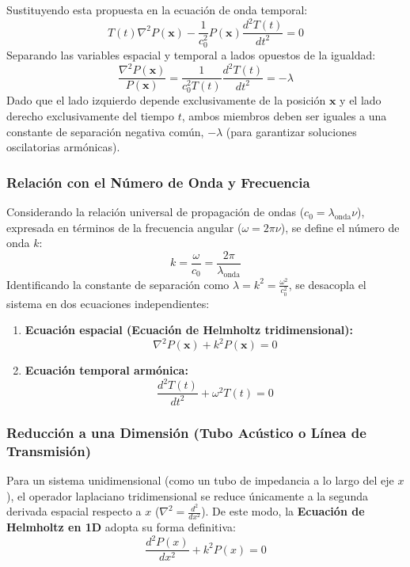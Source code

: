 \documentclass[11pt,letterpaper]{article}
\begin{document}
Sustituyendo esta propuesta en la ecuación de onda temporal:
\begin{equation}
    T(t) \nabla^2 P(\mathbf{x}) - \frac{1}{c_0^2} P(\mathbf{x}) \frac{d^2 T(t)}{dt^2} = 0
\end{equation}
Separando las variables espacial y temporal a lados opuestos de la igualdad:
\begin{equation}
    \frac{\nabla^2 P(\mathbf{x})}{P(\mathbf{x})} = \frac{1}{c_0^2 T(t)} \frac{d^2 T(t)}{dt^2} = -\lambda
\end{equation}
Dado que el lado izquierdo depende exclusivamente de la posición $\mathbf{x}$ y el lado derecho exclusivamente del tiempo $t$, ambos miembros deben ser iguales a una constante de separación negativa común, $-\lambda$ (para garantizar soluciones oscilatorias armónicas).

\subsubsection{Relación con el Número de Onda y Frecuencia}
Considerando la relación universal de propagación de ondas ($c_0 = \lambda_{\text{onda}} \nu$), expresada en términos de la frecuencia angular ($\omega = 2\pi \nu$), se define el número de onda $k$:
\begin{equation}
    k = \frac{\omega}{c_0} = \frac{2\pi}{\lambda_{\text{onda}}}
\end{equation}
Identificando la constante de separación como $\lambda = k^2 = \frac{\omega^2}{c_0^2}$, se desacopla el sistema en dos ecuaciones independientes:

\begin{enumerate}
    \item \textbf{Ecuación espacial (Ecuación de Helmholtz tridimensional):}
    \begin{equation}
        \nabla^2 P(\mathbf{x}) + k^2 P(\mathbf{x}) = 0
    \end{equation}
    
    \item \textbf{Ecuación temporal armónica:}
    \begin{equation}
        \frac{d^2 T(t)}{dt^2} + \omega^2 T(t) = 0
    \end{equation}
\end{enumerate}

\subsubsection{Reducción a una Dimensión (Tubo Acústico o Línea de Transmisión)}
Para un sistema unidimensional (como un tubo de impedancia a lo largo del eje $x$), el operador laplaciano tridimensional se reduce únicamente a la segunda derivada espacial respecto a $x$ ($\nabla^2 = \frac{d^2}{dx^2}$). De este modo, la \textbf{Ecuación de Helmholtz en 1D} adopta su forma definitiva:
\begin{equation}
    \frac{d^2 P(x)}{dx^2} + k^2 P(x) = 0
\end{equation}
\end{document}
